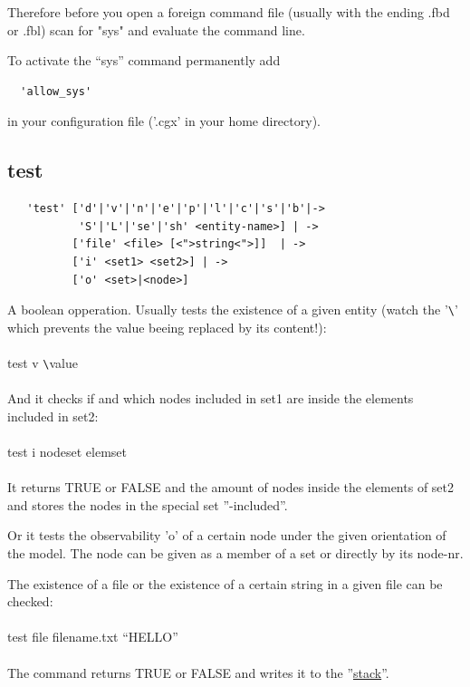 \documentclass{article}
\providecommand{\htmlref}[2]{\hyperref[#2]{#1}}
\begin{document}
Therefore before you open a foreign command file (usually with the ending .fbd or .fbl) scan for "sys" and evaluate the command line.

To activate the ``sys'' command permanently add
\begin{verbatim}
  'allow_sys'
\end{verbatim}
in your configuration file ('.cgx' in your home directory).
 
\subsection{\label{test}test}
\begin{verbatim}
   'test' ['d'|'v'|'n'|'e'|'p'|'l'|'c'|'s'|'b'|->
           'S'|'L'|'se'|'sh' <entity-name>] | ->
          ['file' <file> [<">string<">]]  | ->
          ['i' <set1> <set2>] | ->
          ['o' <set>|<node>]
\end{verbatim}
A boolean opperation. Usually tests the existence of a given entity (watch the '\verb_\_' which prevents the value beeing replaced by its content!):\\\\test v \verb_\_value\\\\And it checks if and which nodes included in set1 are inside the elements included in set2:\\\\test i nodeset elemset\\\\It returns TRUE or FALSE and the amount of nodes inside the elements of set2 and stores the nodes in the special set ''-included''.

Or it tests the observability 'o' of a certain node under the given orientation of the model. The node can be given as a member of a set or directly by its node-nr.

The existence of a file or the existence of a certain string in a given file can be checked:\\\\test file filename.txt ``HELLO''\\\\The command returns TRUE or FALSE and writes it to the ''\htmlref{stack}{stack}''.
\end{document}
